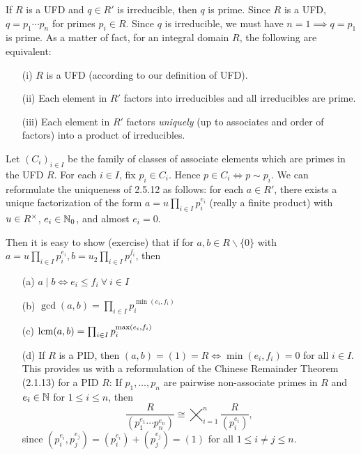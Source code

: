 \documentclass[11pt]{book}
\theoremstyle{definition}   \newtheorem{defn}[counter]{Definition} %
\newcommand{\bs}{\backslash}   \newcommand{\A}{\mathcal{A}}   \newcommand{\sy}{\textnormal{Syl}}   \newcommand{\size}[1]{\left| #1 \right|}
\newcommand{\vs}{\vspace{8pt}}
\numberwithin{counter}{chapter}
\begin{document}
\begin{remark}
If $R$ is a UFD and $q \in R'$ is irreducible, then $q$ is prime. Since $R$ is a UFD, $q = p_1 \cdots p_n$ for primes $p_i \in R$. Since $q$ is irreducible, we must have $n = 1 \implies q = p_1$ is prime. As a matter of fact, for an integral domain $R$, the following are equivalent:
\begin{enumerate}
\item[(i)] $R$ is a UFD (according to our definition of UFD).
\item[(ii)] Each element in $R'$ factors into irreducibles and all irreducibles are prime.
\item[(iii)] Each element in $R'$ factors \emph{uniquely} (up to associates and order of factors) into a product of irreducibles.
\end{enumerate}
\end{remark}

\vs

\begin{remark}
Let $(C_i)_{i \in I}$ be the family of classes of associate elements which are primes in the UFD $R$. For each $i \in I$, fix $p_i \in C_i$. Hence $p \in C_i \iff p \sim p_i$. We can reformulate the uniqueness of 2.5.12 as follows: for each $a \in R'$, there exists a unique factorization of the form $a = u \prod_{i \in I} p_i^{e_i}$ (really a finite product) with $u \in R^{\times}$, $e_i \in \operatorname{\mathbb{N}}_0$, and almost $e_i = 0$.

Then it is easy to show (exercise) that if for $a,b \in R\bs\{0\}$ with $a = u \prod_{i \in I} p_i^{e_i}, b = u_2\prod_{i \in I} p_i^{f_i}$, then
\begin{enumerate}
\item[(a)] $a \mid b \iff e_i \leq f_i \ \forall \ i \in I$
\item[(b)] $\gcd(a,b) = \prod_{i \in I} p_i^{\min(e_i,f_i)} $
\item[(c)] $\operatorname{\textrm{lcm}}(a,b) = \prod_{i \in I} p_i^{\max(e_i,f_i)}$
\item[(d)] If $R$ is a PID, then $(a,b) = (1) = R \iff \min(e_i,f_i) = 0$ for all $i \in I$. This provides us with a reformulation of the Chinese Remainder Theorem (2.1.13) for a PID $R$: If $p_1,\dots,p_n$ are pairwise non-associate primes in $R$ and $e_i \in \operatorname{\mathbb{N}}$ for $1 \leq i \leq n$, then
	\[\frac{R}{(p_1^{e_1}\cdots p_n^{e_n})} \cong  \bigtimes_{i=1}^n \frac{R}{(p_i^{e_i})}, \]
since $(p_i^{e_i},p_j^{e_j}) = (p_i^{e_i}) + (p_j^{e_j}) = (1)$ for all $1 \leq i \ne j \leq n$.
\end{enumerate}
\end{remark}
\end{document}
